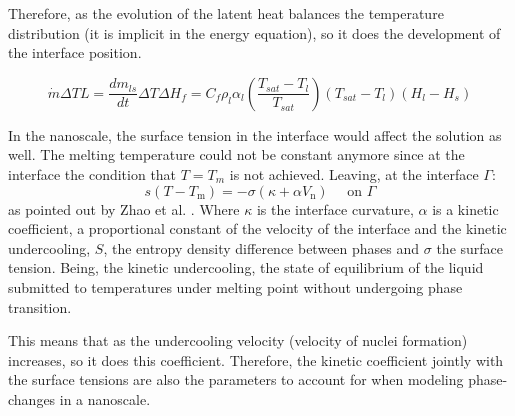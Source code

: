 \noindent Therefore, as the evolution of the latent heat balances the temperature distribution (it is implicit in the energy equation), so it does the development of the interface position.

\begin{equation}
\label{3.50}
\dot{m}\Delta T L = \frac{d m_{l s}}{d t}\Delta T\Delta H_{f}=C_{f} \rho_{l} \alpha_{l}\left(\frac{T_{s a t}-T_{l}}{T_{s a t}}\right)\left(T_{sat}-T_{l}\right)(H_{l}-H_{s})
\end{equation}

\noindent In the nanoscale, the surface tension in the interface would affect the solution as well. The melting temperature could not be constant anymore since at the interface the condition that $T = T_{m}$ is not achieved. Leaving, at the interface $\Gamma$:
\begin{equation}
s\left(T-T_{\mathrm{m}}\right)=-\sigma\left(\kappa+\alpha V_{\mathrm{n}}\right) \quad \text { on } \Gamma
\label{3.51}
\end{equation}
as pointed out by Zhao et al. \cite{zhao_zhao_xu_2018}. Where $\kappa$ is the interface curvature,  $\alpha$	is a kinetic coefficient, a proportional constant of the velocity of the interface and the kinetic undercooling, $S$, the entropy density difference between phases and $\sigma$ the surface tension. Being, the kinetic undercooling, the state of equilibrium of the liquid submitted to temperatures under melting point without undergoing phase transition. 

\noindent This means that as the undercooling velocity (velocity of nuclei formation) increases, so it does this coefficient. Therefore, the kinetic coefficient jointly with the surface tensions are also the parameters to account for when modeling phase-changes in a nanoscale.